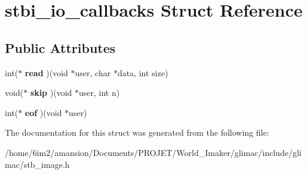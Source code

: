 \hypertarget{structstbi__io__callbacks}{}\section{stbi\+\_\+io\+\_\+callbacks Struct Reference}
\label{structstbi__io__callbacks}
\subsection*{Public Attributes}
\begin{DoxyCompactItemize}
\item 
\mbox{\label{structstbi__io__callbacks_a623e46b3a2a019611601409926283a88}} 
int($\ast$ {\bfseries read} )(void $\ast$user, char $\ast$data, int size)
\item 
\mbox{\label{structstbi__io__callbacks_a257aac5480a90a6c4b8fbe86c1b01068}} 
void($\ast$ {\bfseries skip} )(void $\ast$user, int n)
\item 
\mbox{\label{structstbi__io__callbacks_a319639db2f76e715eed7a7a974136832}} 
int($\ast$ {\bfseries eof} )(void $\ast$user)
\end{DoxyCompactItemize}


The documentation for this struct was generated from the following file\+:\begin{DoxyCompactItemize}
\item 
/home/6im2/amansion/\+Documents/\+P\+R\+O\+J\+E\+T/\+World\+\_\+\+Imaker/glimac/include/glimac/stb\+\_\+image.\+h\end{DoxyCompactItemize}
